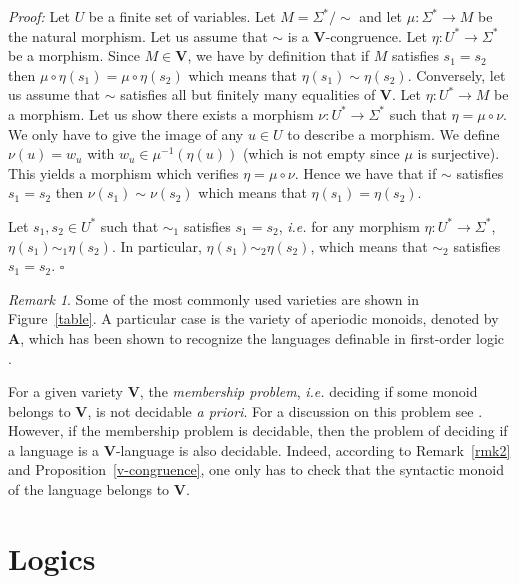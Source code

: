 \documentclass[12pt]{report}
\theoremstyle{definition}
\theoremstyle{remark}
\newtheorem{rmk}{Remark}[section]
\newenvironment{prf}
{\textit{Proof:}}
{\hfill $\square$\\}
\begin{document}
\begin{prf}
Let $U$ be a finite set of variables.
Let $M=\Sigma^\ast/\sim$ and let $\mu: \Sigma^\ast \rightarrow M$ be the natural morphism.
Let us assume that $\sim$ is a \textbf V-congruence.
Let $\eta:U^\ast\rightarrow \Sigma^\ast$ be a morphism.
Since $M\in \mathbf V$, we have by definition that if $M$ satisfies $s_1=s_2$ then $\mu\circ\eta(s_1)=\mu\circ\eta(s_2)$ which means that $\eta(s_1)\sim\eta(s_2)$.
Conversely, let us assume that $\sim$ satisfies all but finitely many equalities of \textbf V.
Let $\eta:U^\ast\rightarrow M$ be a morphism.
Let us show there exists a morphism $\nu:U^\ast \rightarrow \Sigma^\ast$ such that $\eta=\mu\circ\nu$.
We only have to give the image of any $u\in U$ to describe a morphism.
We define $\nu(u)=w_u$ with $w_u\in \mu^{-1}(\eta(u))$ (which is not empty since $\mu$ is surjective).
This yields a morphism which verifies $\eta=\mu\circ\nu$.
Hence we have that if $\sim$ satisfies  $s_1=s_2$ then $\nu(s_1)\sim\nu(s_2)$ which means that $\eta(s_1)=\eta(s_2)$.


Let $s_1,s_2\in U^\ast$ such that $\sim_1$ satisfies $s_1=s_2$,
\emph{i.e.} for any morphism $\eta: U^\ast \rightarrow \Sigma^\ast$, $\eta(s_1)\sim_1\eta(s_2)$.
In particular, $\eta(s_1)\sim_2\eta(s_2)$, which means that $\sim_2$ satisfies $s_1=s_2$.
\end{prf}

\begin{rmk}
Some of the most commonly used varieties are shown in Figure~\ref{table}.
A particular case is the variety of aperiodic monoids, denoted by \textbf A, which has been shown to recognize the languages definable in first-order logic \cite{schutzenberger65,mcnaughtonp71}.

For a given variety \textbf V, the \emph{membership problem}, \emph{i.e.} deciding if some monoid belongs to \textbf V, is not decidable \textit{a priori}.
For a discussion on this problem see \cite{pin97}.
However, if the membership problem is decidable, then the problem of deciding if a language is a \textbf V-language is also decidable. Indeed, according to Remark~\ref{rmk2} and Proposition~\ref{v-congruence}, one only has to check that the syntactic monoid of the language belongs to \textbf V.

\end{rmk}


\section{Logics}
\end{document}
